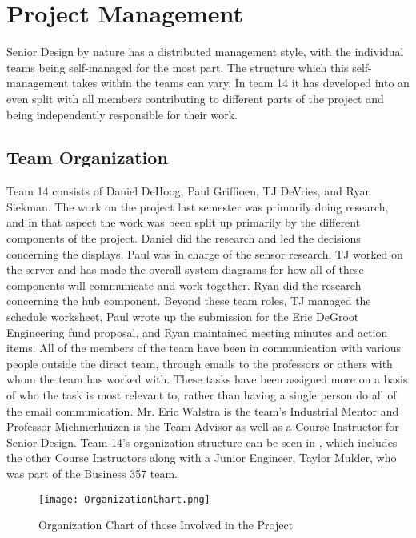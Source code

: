 \documentclass[PPFS.tex]{template/subfiles}
\begin{document}
\section{Project Management}
Senior Design by nature has a distributed management style, with the individual teams being self-managed for the most part. The structure which this self-management takes within the teams can vary. In team 14 it has developed into an even split with all members contributing to different parts of the project and being independently responsible for their work.

    \subsection{Team Organization}
	Team 14 consists of Daniel DeHoog, Paul Griffioen, TJ DeVries, and Ryan Siekman. The work on the project last semester was primarily doing research, and in that aspect the work was been split up primarily by the different components of the project. Daniel did the research and led the decisions concerning the displays. Paul was in charge of the sensor research. TJ worked on the server and has made the overall system diagrams for how all of these components will communicate and work together. Ryan did the research concerning the hub component. Beyond these team roles, TJ managed the schedule worksheet, Paul wrote up the submission for the Eric DeGroot Engineering fund proposal, and Ryan maintained meeting minutes and action items. All of the members of the team have been in communication with various people outside the direct team, through emails to the professors or others with whom the team has worked with. These tasks have been assigned more on a basis of who the task is most relevant to, rather than having a single person do all of the email communication. Mr. Eric Walstra is the team's Industrial Mentor and Professor Michmerhuizen is the Team Advisor as well as a Course Instructor for Senior Design. Team 14's organization structure can be seen in , which includes the other Course Instructors along with a Junior Engineer, Taylor Mulder, who was part of the Business 357 team.
	
	\begin{figure}[h]
		\centering
		\texttt{[image: OrganizationChart.png]}
		\caption{Organization Chart of those Involved in the Project}
		\label{fig:OrganizationChart}
	\end{figure}
	
\end{document}
